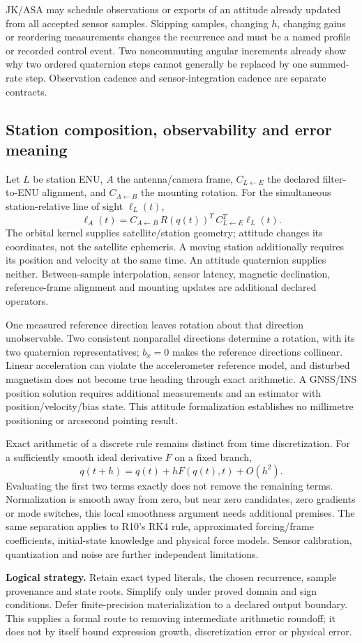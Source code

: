 JK/ASA may schedule observations or exports of an attitude already updated from
all accepted sensor samples. Skipping samples, changing $h$, changing gains or
reordering measurements changes the recurrence and must be a named profile or
recorded control event. Two noncommuting angular increments already show why
two ordered quaternion steps cannot generally be replaced by one summed-rate
step. Observation cadence and sensor-integration cadence are separate contracts.

\subsection{Station composition, observability and error meaning}
Let $L$ be station ENU, $A$ the antenna/camera frame, $C_{L\leftarrow E}$ the
declared filter-to-ENU alignment, and $C_{A\leftarrow B}$ the mounting rotation.
For the simultaneous station-relative line of sight $\ell_L(t)$,
\[
\ell_A(t)=C_{A\leftarrow B}\,R(q(t))^T\,
 C_{L\leftarrow E}^T\ell_L(t).
\]
The orbital kernel supplies satellite/station geometry; attitude changes its
coordinates, not the satellite ephemeris. A moving station additionally requires
its position and velocity at the same time. An attitude quaternion supplies
neither. Between-sample interpolation, sensor latency, magnetic declination,
reference-frame alignment and mounting updates are additional declared operators.

One measured reference direction leaves rotation about that direction
unobservable. Two consistent nonparallel directions determine a rotation,
with its two quaternion representatives; $b_x=0$ makes the reference directions
collinear. Linear acceleration can violate the accelerometer reference model,
and disturbed magnetism does not become true heading through exact arithmetic.
A GNSS/INS position solution requires additional measurements and an estimator
with position/velocity/bias state. This attitude formalization establishes no
millimetre positioning or arcsecond pointing result.

Exact arithmetic of a discrete rule remains distinct from time discretization.
For a sufficiently smooth ideal derivative $F$ on a fixed branch,
\[
q(t+h)=q(t)+hF(q(t),t)+O(h^2).
\]
Evaluating the first two terms exactly does not remove the remaining terms.
Normalization is smooth away from zero, but near zero candidates, zero gradients
or mode switches, this local smoothness argument needs additional premises.
The same separation applies to R10's RK4 rule, approximated forcing/frame
coefficients, initial-state knowledge and physical force models. Sensor
calibration, quantization and noise are further independent limitations.

\begin{panel}
\textbf{Logical strategy.} Retain exact typed literals, the chosen recurrence,
sample provenance and state roots. Simplify only under proved domain and sign
conditions. Defer finite-precision materialization to a declared output boundary.
This supplies a formal route to removing intermediate arithmetic roundoff; it
does not by itself bound expression growth, discretization error or physical error.
\end{panel}
